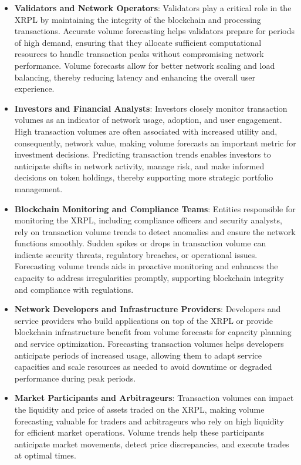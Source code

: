 \documentclass{article}
\begin{document}
\begin{itemize}
    \item \textbf{Validators and Network Operators}: Validators play a critical role in the XRPL by maintaining the integrity of the blockchain and processing transactions. Accurate volume forecasting helps validators prepare for periods of high demand, ensuring that they allocate sufficient computational resources to handle transaction peaks without compromising network performance. Volume forecasts allow for better network scaling and load balancing, thereby reducing latency and enhancing the overall user experience.
    
    \item \textbf{Investors and Financial Analysts}: Investors closely monitor transaction volumes as an indicator of network usage, adoption, and user engagement. High transaction volumes are often associated with increased utility and, consequently, network value, making volume forecasts an important metric for investment decisions. Predicting transaction trends enables investors to anticipate shifts in network activity, manage risk, and make informed decisions on token holdings, thereby supporting more strategic portfolio management.
    
    \item \textbf{Blockchain Monitoring and Compliance Teams}: Entities responsible for monitoring the XRPL, including compliance officers and security analysts, rely on transaction volume trends to detect anomalies and ensure the network functions smoothly. Sudden spikes or drops in transaction volume can indicate security threats, regulatory breaches, or operational issues. Forecasting volume trends aids in proactive monitoring and enhances the capacity to address irregularities promptly, supporting blockchain integrity and compliance with regulations.
    
    \item \textbf{Network Developers and Infrastructure Providers}: Developers and service providers who build applications on top of the XRPL or provide blockchain infrastructure benefit from volume forecasts for capacity planning and service optimization. Forecasting transaction volumes helps developers anticipate periods of increased usage, allowing them to adapt service capacities and scale resources as needed to avoid downtime or degraded performance during peak periods.
    
    \item \textbf{Market Participants and Arbitrageurs}: Transaction volumes can impact the liquidity and price of assets traded on the XRPL, making volume forecasting valuable for traders and arbitrageurs who rely on high liquidity for efficient market operations. Volume trends help these participants anticipate market movements, detect price discrepancies, and execute trades at optimal times.
\end{itemize}
\end{document}
